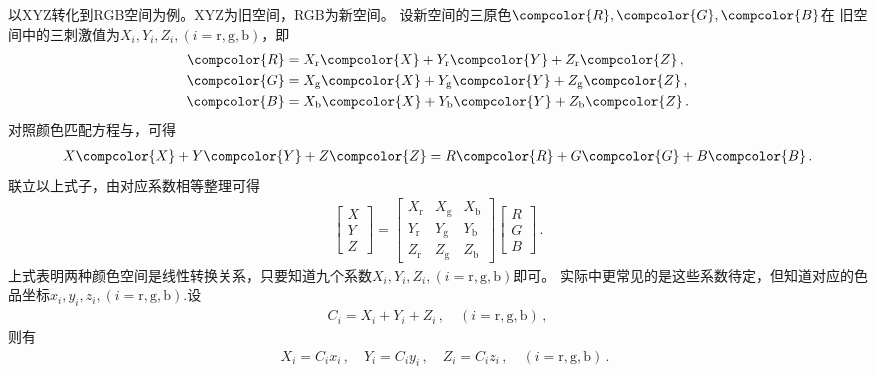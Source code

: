 以XYZ转化到RGB空间为例。XYZ为旧空间，RGB为新空间。
设新空间的三原色$\compcolor{R},\compcolor{G},\compcolor{B}$在
旧空间中的三刺激值为$X_i,Y_i,Z_i,(i=\mathrm{r},\mathrm{g},\mathrm{b})$，即
\begin{align}\label{eq:colorbasis}
      \compcolor{R} & =X_\mathrm{r}\compcolor{X}+Y_\mathrm{r}\compcolor{Y}+Z_\mathrm{r}\compcolor{Z}\, , \\
      \compcolor{G} & =X_\mathrm{g}\compcolor{X}+Y_\mathrm{g}\compcolor{Y}+Z_\mathrm{g}\compcolor{Z}\, , \\
      \compcolor{B} & =X_\mathrm{b}\compcolor{X}+Y_\mathrm{b}\compcolor{Y}+Z_\mathrm{b}\compcolor{Z}\, .
\end{align}
对照颜色匹配方程与，可得
\begin{align}
      X\compcolor{X}+Y\compcolor{Y}+Z\compcolor{Z}=R\compcolor{R}+G\compcolor{G}+B\compcolor{B}\, .
\end{align}
联立以上式子，由对应系数相等整理可得
\begin{align}
      \left[\begin{array}{c}
                  X \\Y\\Z
            \end{array}\right]=
      \left[\begin{array}{ccc}
                  X_\mathrm{r} & X_\mathrm{g} & X_\mathrm{b} \\
                  Y_\mathrm{r} & Y_\mathrm{g} & Y_\mathrm{b} \\
                  Z_\mathrm{r} & Z_\mathrm{g} & Z_\mathrm{b}
            \end{array}\right]
      \left[\begin{array}{c}
                  R \\G\\B
            \end{array}\right]\, .
\end{align}
上式表明两种颜色空间是线性转换关系，只要知道九个系数$X_i,Y_i,Z_i,(i=\mathrm{r},\mathrm{g},\mathrm{b})$即可。
实际中更常见的是这些系数待定，但知道对应的色品坐标$x_i,y_i,z_i,(i=\mathrm{r},\mathrm{g},\mathrm{b})$.设
\begin{align}
      C_i=X_i+Y_i+Z_i\, ,\quad (i=\mathrm{r},\mathrm{g},\mathrm{b})\, ,
\end{align}
则有
\begin{align}\quad
      X_i=C_ix_i\, ,\quad Y_i=C_iy_i\, ,\quad Z_i=C_iz_i\, ,\quad (i=\mathrm{r},\mathrm{g},\mathrm{b})\, .
\end{align}

